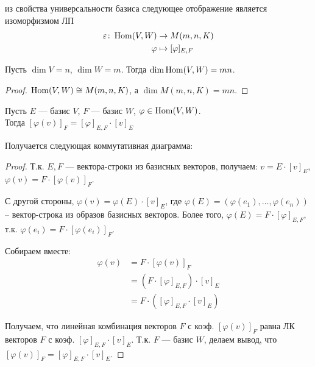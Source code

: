 \follow из свойства универсальности базиса следующее отображение
является изоморфизмом ЛП
\begin{align*}
    \varepsilon \colon \operatorname{Hom}(V, W) &\to M(m, n, K)\\
    \varphi &\mapsto [ \varphi ]_{E, F}
\end{align*}

\follow Пусть $\dim V = n$, $\dim W = m$. Тогда $\dim \operatorname{Hom}(V, W) = mn$.
\begin{proof}
    $\operatorname{Hom}(V, W) \cong M(m, n, K)$, а $\dim M(m, n, K) = mn$.
\end{proof}

\begin{theorem}
    Пусть $E$ --- базис $V$, $F$ --- базис $W$, $\varphi \in \operatorname{Hom}(V, W)$. \\
    Тогда $[\varphi(v)]_F = [\varphi]_{E, F} \cdot [v]_E$
\end{theorem}
Получается следующая коммутативная диаграмма:
\begin{center}
\end{center}
\begin{proof}
    Т.к. $E, F$ --- вектора-строки из базисных векторов, получаем: 
    $v = E \cdot [v]_E$,  $\varphi(v) = F \cdot [\varphi(v)]_F$.

    С другой стороны, $\varphi(v) = \varphi(E) \cdot [v]_E$, где
    $\varphi(E) = (\varphi(e_1), \dots, \varphi(e_n))$ -- вектор-строка
    из образов базисных векторов. Более того, 
    $\varphi(E) = F \cdot [\varphi]_{E, F}$, т.к. 
    $\varphi(e_i) = F \cdot [\varphi(e_i)]_F$.

    Собираем вместе:
    \begin{align*}
        \varphi(v) &= F \cdot [\varphi(v)]_F \\
        &= (F \cdot [\varphi]_{E, F}) \cdot [v]_E \\
        &= F \cdot ([\varphi]_{E, F} \cdot [v]_E)
    \end{align*}

    Получаем, что линейная комбинация векторов $F$ с коэф.
    $[\varphi(v)]_F$ равна ЛК векторов $F$ с коэф.
    $[\varphi]_{E, F} \cdot [v]_E$. Т.к. $F$ --- базис $W$, делаем вывод,
    что $[\varphi(v)]_F = [\varphi]_{E, F} \cdot [v]_E$.
\end{proof}

